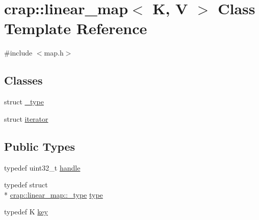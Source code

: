 \hypertarget{classcrap_1_1linear__map}{\section{crap\+:\+:linear\+\_\+map$<$ K, V $>$ Class Template Reference}
\label{classcrap_1_1linear__map}
}


{\ttfamily \#include $<$map.\+h$>$}

\subsection*{Classes}
\begin{DoxyCompactItemize}
\item 
struct \hyperlink{structcrap_1_1linear__map_1_1__type}{\+\_\+type}
\item 
struct \hyperlink{structcrap_1_1linear__map_1_1iterator}{iterator}
\end{DoxyCompactItemize}
\subsection*{Public Types}
\begin{DoxyCompactItemize}
\item 
typedef uint32\+\_\+t \hyperlink{classcrap_1_1linear__map_af77a9e092bd3ffb9557327bd3082e47f}{handle}
\item 
typedef struct \\*
\hyperlink{structcrap_1_1linear__map_1_1__type}{crap\+::linear\+\_\+map\+::\+\_\+type} \hyperlink{classcrap_1_1linear__map_ad8544be54068ac03936e6696c076bf9a}{type}
\item 
typedef K \hyperlink{classcrap_1_1linear__map_a710c4784756c34edffaba22d614a0af0}{key}
\end{DoxyCompactItemize}
